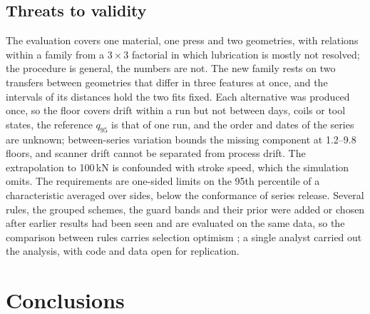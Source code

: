 \documentclass[pdflatex,sn-basic,lineno]{sn-jnl}
\begin{document}
\subsection{Threats to validity}

The evaluation covers one material, one press and two geometries, with relations within a family from a $3\times3$ factorial in which lubrication is mostly not resolved; the procedure is general, the numbers are not. The new family rests on two transfers between geometries that differ in three features at once, and the intervals of its distances hold the two fits fixed. Each alternative was produced once, so the floor covers drift within a run but not between days, coils or tool states, the reference $q_{95}$ is that of one run, and the order and dates of the series are unknown; between-series variation bounds the missing component at 1.2--9.8 floors, and scanner drift cannot be separated from process drift. The extrapolation to 100\,kN is confounded with stroke speed, which the simulation omits. The requirements are one-sided limits on the 95th percentile of a characteristic averaged over sides, below the conformance of series release. Several rules, the grouped schemes, the guard bands and their prior were added or chosen after earlier results had been seen and are evaluated on the same data, so the comparison between rules carries selection optimism \citep{cawley2010over}; a single analyst carried out the analysis, with code and data open for replication.

\section{Conclusions}\label{sec:conclusion}
\end{document}
